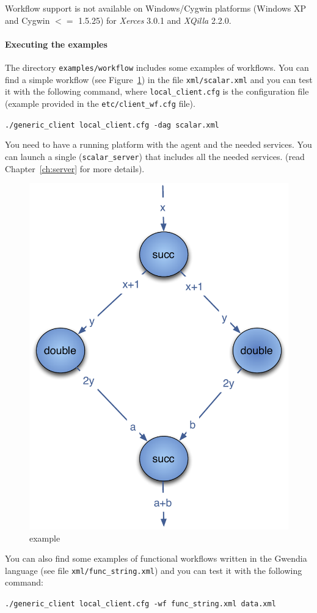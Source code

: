 \begin{remarque}
Workflow support is not available on Windows/Cygwin platforms (Windows XP and
Cygwin $<=$ 1.5.25) for \textit{Xerces} 3.0.1 and \textit{XQilla} 2.2.0.
\end{remarque}

\paragraph{Executing the examples}
\label{sec:wf_examples}

The directory \texttt{examples/workflow} includes some examples of workflows.
You can find a simple \DAG workflow (see Figure~\ref{fig:example1}) in the file
\texttt{xml/scalar.xml} and you can test it with the following command, where
\texttt{local\_client.cfg} is the \diet configuration file (example provided in
the \texttt{etc/client\_wf.cfg} file).

\verb|./generic_client local_client.cfg -dag scalar.xml |

You need to have a running \diet platform with the \madag agent and the needed
services. You can launch a single \sed (\texttt{scalar\_server}) that includes
all the needed services. (read Chapter~\ref{ch:server} for more details).

\begin{figure}[htbp]
  \centering
  \includegraphics[keepaspectratio,width=0.4\linewidth]{fig/wf_example1}
  \caption{\DAG example}
  \label{fig:example1}
\end{figure}

You can also find some examples of functional workflows written in the Gwendia
language (see file \texttt{xml/func\_string.xml}) and you can test it with the
following command:

\verb|./generic_client local_client.cfg -wf func_string.xml data.xml |

